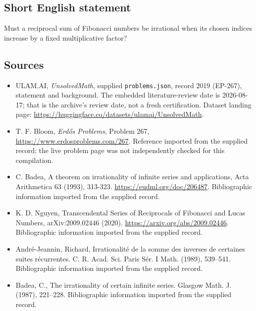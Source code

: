 \documentclass[11pt,a4paper]{article}
\begin{document}
\subsection{Short English statement}

Must a reciprocal sum of Fibonacci numbers be irrational when its chosen indices increase by a fixed multiplicative factor?

\subsection{Sources}

{\small

\begin{itemize}

\item[\hypertarget{source:2019:1}{S1}] ULAM.AI, \emph{UnsolvedMath}, supplied \texttt{problems.json}, record 2019 (EP-267), statement and background. The embedded literature-review date is 2026-08-17; that is the archive’s review date, not a fresh certification. Dataset landing page: \url{https://huggingface.co/datasets/ulamai/UnsolvedMath}.

\item[\hypertarget{source:2019:2}{S2}] T. F. Bloom, \emph{Erdős Problems}, Problem 267, \url{https://www.erdosproblems.com/267}. Reference imported from the supplied record; the live problem page was not independently checked for this compilation.

\item[\hypertarget{source:2019:3}{S3}] C. Badea, A theorem on irrationality of infinite series and applications, Acta Arithmetica 63 (1993), 313-323. \url{https://eudml.org/doc/206487}. Bibliographic information imported from the supplied record.

\item[\hypertarget{source:2019:4}{S4}] K. D. Nguyen, Transcendental Series of Reciprocals of Fibonacci and Lucas Numbers, arXiv:2009.02446 (2020). \url{https://arxiv.org/abs/2009.02446}. Bibliographic information imported from the supplied record.

\item[\hypertarget{source:2019:5}{S5}] Andr\'{e}-Jeannin, Richard, Irrationalit\'{e}{} de la somme des inverses de certaines suites r\'{e}currentes. C. R. Acad. Sci. Paris S\'{e}r. I Math. (1989), 539--541. Bibliographic information imported from the supplied record.

\item[\hypertarget{source:2019:6}{S6}] Badea, C., The irrationality of certain infinite series. Glasgow Math. J. (1987), 221--228. Bibliographic information imported from the supplied record.

\end{itemize}

}

\label{end:2019}
\end{document}
